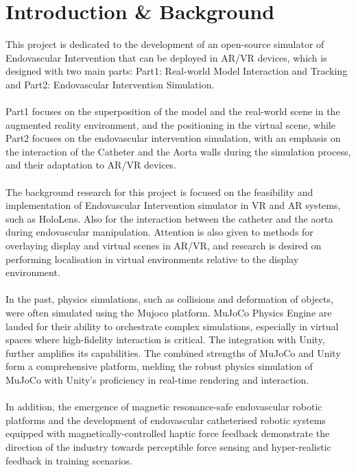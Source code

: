 \documentclass[12pt]{article}
\begin{document}
\section{Introduction \& Background}
This project is dedicated to the development of an open-source simulator of Endovascular Intervention that can be deployed in AR/VR devices, which is designed with two main parts: Part1: Real-world Model Interaction and Tracking and Part2: Endovascular Intervention Simulation.
\\\\
Part1 focuses on the superposition of the model and the real-world scene in the augmented reality environment, and the positioning in the virtual scene, while Part2 focuses on the endovascular intervention simulation, with an emphasis on the interaction of the Catheter and the Aorta walls during the simulation process, and their adaptation to AR/VR devices.
\\\\
The background research for this project is focused on the feasibility and implementation of Endovascular Intervention simulator in VR and AR systems, such as HoloLens. Also for the interaction between the catheter and the aorta during endovascular manipulation. Attention is also given to methods for overlaying display and virtual scenes in AR/VR, and research is desired on performing localisation in virtual environments relative to the display environment.
\\\\
In the past, physics simulations, such as collisions and deformation of objects, were often simulated using the Mujoco platform. MuJoCo Physics Engine are lauded for their ability to orchestrate complex simulations, especially in virtual spaces where high-fidelity interaction is critical\cite{mujoco}. The integration with Unity, further amplifies its capabilities. The combined strengths of MuJoCo and Unity form a comprehensive platform, melding the robust physics simulation of MuJoCo with Unity’s proficiency in real-time rendering and interaction\cite{Juliani2018UnityAG}. 
\\\\
In addition, the emergence of magnetic resonance-safe endovascular robotic platforms and the development of endovascular catheterised robotic systems equipped with magnetically-controlled haptic force feedback demonstrate the direction of the industry towards perceptible force sensing and hyper-realistic feedback in training scenarios.\cite{9376657,Li2022AnEC}
\\\\
\end{document}

